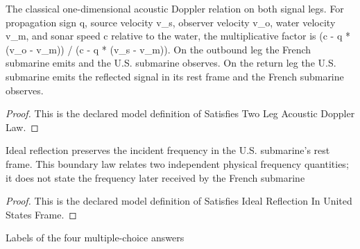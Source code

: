\begin{definition}
  \label{def:physics:phyx-mini-0319:phyxminiproblems-problemphyxmini0319-satisfiestwolegacousticdopplerlaw}
  The classical one-dimensional acoustic Doppler relation on both signal legs. For propagation sign q, source velocity v\_s, observer velocity v\_o, water velocity v\_m, and sonar speed c relative to the water, the multiplicative factor is (c - q * (v\_o - v\_m)) / (c - q * (v\_s - v\_m)). On the outbound leg the French submarine emits and the U.S. submarine observes. On the return leg the U.S. submarine emits the reflected signal in its rest frame and the French submarine observes.
\end{definition}
\begin{proof}
  This is the declared model definition of Satisfies Two Leg Acoustic Doppler Law.
\end{proof}
\begin{definition}
  \label{def:physics:phyx-mini-0319:phyxminiproblems-problemphyxmini0319-satisfiesidealreflectioninunitedstatesframe}
  Ideal reflection preserves the incident frequency in the U.S. submarine's rest frame. This boundary law relates two independent physical frequency quantities; it does not state the frequency later received by the French submarine
\end{definition}
\begin{proof}
  This is the declared model definition of Satisfies Ideal Reflection In United States Frame.
\end{proof}
\begin{definition}
  \label{def:physics:phyx-mini-0319:phyxminiproblems-problemphyxmini0319-answerchoice}
  Labels of the four multiple-choice answers
\end{definition}
